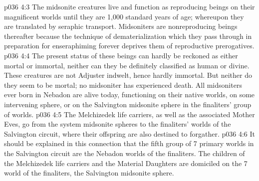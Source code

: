 \vs p036 4:3 The midsonite creatures live and function as reproducing beings on their magnificent worlds until they are 1,000 standard years of age; whereupon they are translated by seraphic transport. Midsoniters are nonreproducing beings thereafter because the technique of dematerialization which they pass through in preparation for enseraphiming forever deprives them of reproductive prerogatives.
\vs p036 4:4 The present status of these beings can hardly be reckoned as either mortal or immortal, neither can they be definitely classified as human or divine. These creatures are not Adjuster indwelt, hence hardly immortal. But neither do they seem to be mortal; no midsoniter has experienced death. All midsoniters ever born in Nebadon are alive today, functioning on their native worlds, on some intervening sphere, or on the Salvington midsonite sphere in the finaliters’ group of worlds.
\vs p036 4:5 \pc {} The Melchizedek life carriers, as well as the associated Mother Eves, go from the system midsonite spheres to the finaliters’ worlds of the Salvington circuit, where their offspring are also destined to forgather.
\vs p036 4:6 It should be explained in this connection that the fifth group of 7 primary worlds in the Salvington circuit are the Nebadon worlds of the finaliters. The children of the Melchizedek life carriers and the Material Daughters are domiciled on the 7 world of the finaliters, the Salvington midsonite sphere.
